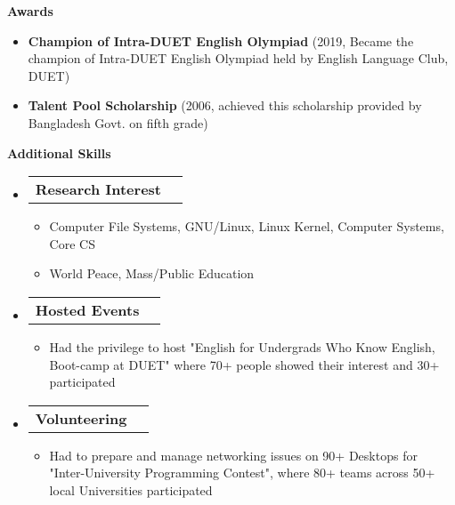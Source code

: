 \documentclass[letterpaper,10pt]{article}
\makeatletter
\newcommand{\resheading}[1]{{\large \colorbox{mygrey}{\begin{minipage}{\textwidth}{\textbf{#1 \vphantom{p\^{E}}}}\end{minipage}}}}
\newcommand{\ressubheading}[4]{
	\begin{tabular*}{7.0in}{l@{\extracolsep{\fill}}r}
		\textbf{#1} & \textit{#4} \\
	\end{tabular*}\vspace{-6pt}}
\makeatother
\begin{document}
	\vspace{0.3in}
	
	\resheading{Awards}
	\begin{itemize}
				
		\item \textbf{Champion of Intra-DUET English Olympiad} (2019, Became the champion of Intra-DUET English Olympiad held by English Language Club, DUET)
		
		\item \textbf{Talent Pool Scholarship} (2006, achieved this scholarship provided by Bangladesh Govt. on fifth grade)

	\end{itemize}

	
	\vspace{0.3in}
	
	\resheading{Additional Skills}
	\begin{itemize}
		\item \ressubheading{Research Interest}{}{}{}
		\begin{itemize}
			\item Computer File Systems, GNU/Linux, Linux Kernel, Computer Systems, Core CS
			\item World Peace, Mass/Public Education
		\end{itemize}
		
		\item \ressubheading{Hosted Events}{}{}{}
		\begin{itemize}
			\item Had the privilege to host "English for Undergrads Who Know English, Boot-camp at DUET" where 70+ people showed their interest and 30+ participated
		\end{itemize}
	
		\item \ressubheading{Volunteering}{}{}{}
		\begin{itemize}
			\item Had to prepare and manage networking issues on 90+ Desktops for "Inter-University Programming Contest", where 80+ teams across 50+ local Universities participated
		\end{itemize}

	\end{itemize}
\vfill
\end{document}
